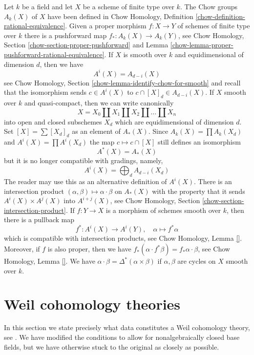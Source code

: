 \medskip\noindent
Let $k$ be a field and let $X$ be a scheme of finite type over $k$.
The Chow groups $A_k(X)$ of $X$ have been defined in
Chow Homology, Definition \ref{chow-definition-rational-equivalence}.
Given a proper morphism $f : X \to Y$ of schemes of finite
type over $k$ there is a pushforward map $f_* : A_k(X) \to A_k(Y)$,
see Chow Homology, Section \ref{chow-section-proper-pushforward} and
Lemma \ref{chow-lemma-proper-pushforward-rational-equivalence}.
If $X$ is smooth over $k$ and equidimensional of dimension $d$, then
we have
$$
A^i(X) = A_{d - i}(X)
$$
see Chow Homology, Section \ref{chow-lemma-identify-chow-for-smooth}
and recall that the isomorphism sends $c \in A^i(X)$ to
$c \cap [X]_d \in A_{d - i}(X)$.
If $X$ smooth over $k$ and quasi-compact, then we can write canonically
$$
X = X_0 \amalg X_1 \amalg X_2 \amalg \ldots \amalg X_n
$$
into open and closed subschemes $X_d$ which are
equidimensional of dimension $d$. Set $[X] = \sum [X_d]_d$
as an element of $A_*(X)$. Since
$A_k(X) = \prod A_k(X_d)$ and $A^i(X) = \prod A^i(X_d)$
the map $c \mapsto c \cap [X]$ still defines an isomorphism
$$
A^*(X) = A_*(X)
$$
but it is no longer compatible with gradings, namely,
$$
A^i(X) = \bigoplus\nolimits_d A_{d - i}(X_d)
$$
The reader may use this as an alternative definition of $A^i(X)$.
There is an intersection product
$(\alpha, \beta) \mapsto \alpha \cdot \beta$ on $A_*(X)$
with the property that it sends $A^i(X) \times A^j(X)$ into $A^{i + j}(X)$,
see Chow Homology, Section \ref{chow-section-intersection-product}.
If $f : Y \to X$ is a morphism of schemes smooth over $k$, then
there is a pullback map
$$
f^* : A^i(X) \to A^i(Y),\quad
\alpha \mapsto f^*\alpha
$$
which is compatible with intersection products, see
Chow Homology, Lemma \ref{}.
Moreover, if $f$ is also proper, then
we have $f_*(\alpha \cdot f^*\beta) = f_*\alpha \cdot \beta$, see
Chow Homology, Lemma \ref{}.
We have $\alpha \cdot \beta = \Delta^*(\alpha \times \beta)$
if $\alpha, \beta$ are cycles on $X$ smooth over $k$.










\section{Weil cohomology theories}
\label{section-axioms}

\noindent
In this section we state precisely what data constitutes a
Weil cohomology theory, see \cite[Section 1.2]{Kleiman-cycles}.
We have modified the conditions to allow for nonalgebraically closed
base fields, but we have otherwise stuck to the original as
closely as possible.

